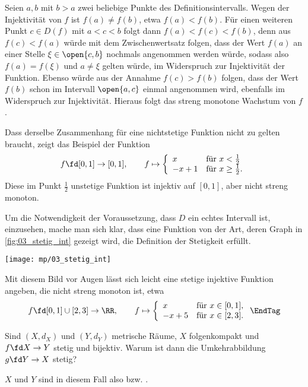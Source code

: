 \begin{antwort}
  Seien $a,b$ mit $b>a$ zwei beliebige Punkte des Definitionsintervalls. 
  Wegen der Injektivität von $f$ ist $f(a)\not=f(b)$, 
  etwa $f(a)<f(b)$. Für einen weiteren Punkt $c\in D(f)$ mit $a<c<b$ 
  folgt dann $f(a)<f(c)<f(b)$, denn aus $f(c)<f(a)$ würde mit dem 
  Zwischenwertsatz folgen, 
  dass der Wert $f(a)$ an einer Stelle $\xi\in \open{c,b}$ nochmals 
  angenommen werden würde, sodass also 
  $f(a)=f(\xi)$ und $a\not=\xi$ gelten würde, im 
  Widerspruch zur Injektivität der Funktion. Ebenso würde aus der Annahme 
  $f(c)>f(b)$ folgen, dass der Wert $f(b)$ schon im Intervall $\open{a,c}$ 
  einmal angenommen wird, ebenfalls im Widerspruch zur Injektivität. 
  Hieraus folgt das streng monotone Wachstum von $f$. 

  Dass derselbe Zusammenhang für eine nichtstetige Funktion nicht 
  zu gelten braucht, zeigt das Beispiel der Funktion 
  \[
  f\fd [0,1] \to [0,1], \qquad
  f\mapsto \left\{ \begin{array}{ll}
      x & \text{für $x < \frac{1}{2}$}\\
      -x+1 &\text{für $x \ge \frac{1}{2}$.}
    \end{array}\right.
  \] 
  Diese im Punkt $\frac{1}{2}$ unstetige Funktion ist injektiv auf $[0,1]$, 
  aber nicht streng monoton. 


  Um die Notwendigkeit der Voraussetzung, dass $D$ ein echtes 
  Intervall ist, einzusehen, mache man sich klar, dass eine 
  Funktion von der Art, 
  deren Graph in \Abb\ref{fig:03_stetig_int} gezeigt wird, die 
  Definition der Stetigkeit erfüllt.  

  \begin{center}
    \texttt{[image: mp/03\_stetig\_int]}
    \label{fig:03_stetig_int}
  \end{center}

  Mit diesem Bild vor Augen lässt sich leicht eine stetige injektive Funktion 
  angeben, die nicht streng monoton ist, etwa
  \[
  f\fd [0,1]\cup[2,3] \to \RR, \qquad
  f\mapsto \left\{ \begin{array}{ll}
      x  & \text{für $x\in[0,1]$},\\
      -x+5 & \text{für $x\in[2,3]$.}
    \end{array}\right.
  \EndTag
  \] 
\end{antwort}

\begin{frage}\label{03_stum}
  Sind $(X,d_X)$ und $(Y,d_Y)$ metrische Räume, $X$ folgenkompakt und 
  $f\fd X\to Y$ stetig und bijektiv. Warum ist dann die Umkehrabbildung 
  $g\fd Y\to X$ stetig?

  $X$ und $Y$ sind in diesem Fall also  
  bzw. .
\end{frage}

